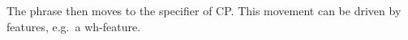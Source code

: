 \documentclass[crop]{standalone}
\begin{document}
The phrase then moves to the specifier of CP\@.
This movement can be driven by features, e.g.\ a wh-feature.
\end{document}
